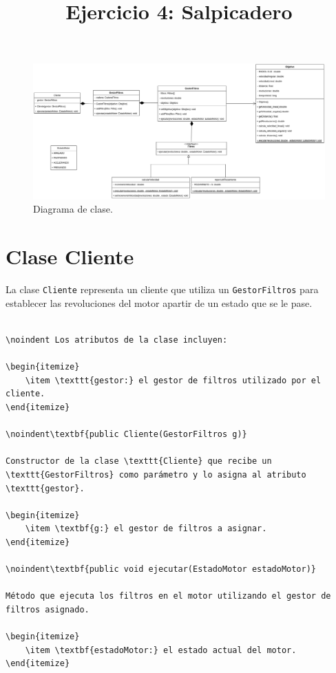 \documentclass{article}
\title{Ejercicio 4: Salpicadero}
\begin{document}
\maketitle

\begin{figure}[h]
    \centering
    \includegraphics[width=1.2\textwidth]{Ej4_Practica1_DS.png}
    \caption{Diagrama de clase.}
    \label{fig:ejemplo}
\end{figure}

\section{Clase Cliente}

La clase \texttt{Cliente} representa un cliente que utiliza un \texttt{GestorFiltros} para establecer las revoluciones del motor apartir de un estado que se le pase.

\begin{lstlisting}

\noindent Los atributos de la clase incluyen:

\begin{itemize}
    \item \texttt{gestor:} el gestor de filtros utilizado por el cliente.
\end{itemize}

\noindent\textbf{public Cliente(GestorFiltros g)}

Constructor de la clase \texttt{Cliente} que recibe un \texttt{GestorFiltros} como parámetro y lo asigna al atributo \texttt{gestor}.

\begin{itemize}
    \item \textbf{g:} el gestor de filtros a asignar.
\end{itemize}

\noindent\textbf{public void ejecutar(EstadoMotor estadoMotor)}

Método que ejecuta los filtros en el motor utilizando el gestor de filtros asignado.

\begin{itemize}
    \item \textbf{estadoMotor:} el estado actual del motor.
\end{itemize}

\end{lstlisting}
\end{document}
